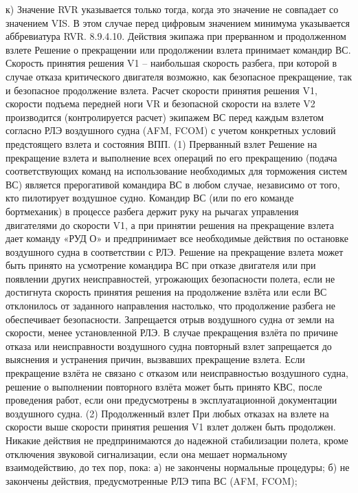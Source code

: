 к)	Значение RVR указывается только тогда, когда это значение не совпадает со значением VIS. В этом случае перед цифровым значением минимума указывается аббревиатура RVR.
8.9.4.10.	Действия экипажа при прерванном и продолженном взлете 
Решение о прекращении или продолжении взлета принимает командир ВС. 
Скорость принятия решения V1 – наибольшая скорость разбега, при которой в случае отказа критического двигателя возможно, как безопасное прекращение, так и безопасное продолжение взлета. 
Расчет скорости принятия решения V1, скорости подъема передней ноги VR и безопасной скорости на взлете V2 производится (контролируется расчет) экипажем ВС перед каждым взлетом согласно РЛЭ воздушного судна (AFM, FCOM) с учетом конкретных условий предстоящего взлета и состояния ВПП.
(1) Прерванный взлет
Решение на прекращение взлета и выполнение всех операций по его прекращению (подача соответствующих команд на использование необходимых для торможения систем ВС) является прерогативой командира ВС в любом случае, независимо от того, кто пилотирует воздушное судно. 
Командир ВС (или по его команде бортмеханик) в процессе разбега держит руку на рычагах управления двигателями до скорости V1, а при принятии решения на прекращение взлета дает команду «РУД О» и предпринимает все необходимые действия по остановке воздушного судна в соответствии с РЛЭ. 
Решение на прекращение взлета может быть принято на усмотрение командира ВС при отказе двигателя или при появлении других неисправностей, угрожающих безопасности полета, если не достигнута скорость принятия решения на продолжение взлёта или если ВС отклонилось от заданного направления настолько, что продолжение разбега не обеспечивает безопасности. Запрещается отрыв воздушного судна от земли на скорости, менее установленной РЛЭ.
В случае прекращения взлёта по причине отказа или неисправности воздушного судна повторный взлет запрещается до выяснения и устранения причин, вызвавших прекращение взлета. 
Если прекращение взлёта не связано с отказом или неисправностью воздушного судна, решение о выполнении повторного взлёта может быть принято КВС, после проведения работ, если они предусмотрены в эксплуатационной документации воздушного судна.
(2) Продолженный взлет
При любых отказах на взлете на скорости выше скорости принятия решения V1 взлет должен быть продолжен. 
Никакие действия не предпринимаются до надежной стабилизации полета, кроме отключения звуковой сигнализации, если она мешает нормальному взаимодействию, до тех пор, пока: 
а)	не закончены нормальные процедуры;
б)	не закончены действия, предусмотренные РЛЭ типа ВС (AFM, FCOM); 
